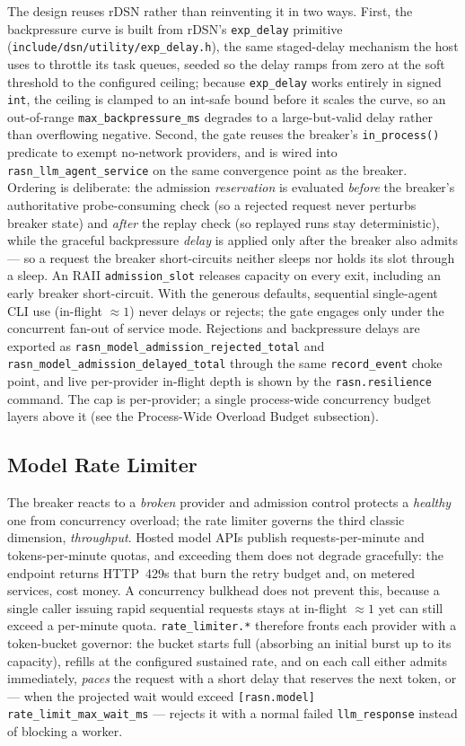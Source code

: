 \documentclass[manuscript,screen,review]{acmart}
\newcommand{\rdsn}{rDSN\xspace}
\begin{document}
The design reuses \rdsn rather than reinventing it in two ways. First, the
backpressure curve is built from \rdsn's \texttt{exp\_delay} primitive
(\texttt{include/dsn/utility/exp\_delay.h}), the same staged-delay mechanism the host
uses to throttle its task queues, seeded so the delay ramps from zero at the soft
threshold to the configured ceiling; because \texttt{exp\_delay} works entirely in
signed \texttt{int}, the ceiling is clamped to an int-safe bound before it scales the
curve, so an out-of-range \texttt{max\_backpressure\_ms} degrades to a
large-but-valid delay rather than overflowing negative. Second, the gate reuses the
breaker's \texttt{in\_process()} predicate to exempt no-network providers, and is
wired into \texttt{rasn\_llm\_agent\_service} on the same convergence point as the
breaker. Ordering is deliberate: the admission \emph{reservation} is evaluated
\emph{before} the breaker's authoritative probe-consuming check (so a rejected
request never perturbs breaker state) and \emph{after}
the replay check (so replayed runs stay deterministic), while the graceful
backpressure \emph{delay} is applied only after the breaker also admits --- so a
request the breaker short-circuits neither sleeps nor holds its slot through a
sleep. An RAII \texttt{admission\_slot} releases capacity on every exit, including
an early breaker short-circuit. With the generous
defaults, sequential single-agent CLI use (in-flight $\approx 1$) never delays or
rejects; the gate engages only under the concurrent fan-out of service mode.
Rejections and backpressure delays are exported as
\texttt{rasn\_model\_admission\_rejected\_total} and
\texttt{rasn\_model\_admission\_delayed\_total} through the same
\texttt{record\_event} choke point, and live per-provider in-flight depth is shown by
the \texttt{rasn.resilience} command. The cap is per-provider; a single
process-wide concurrency budget layers above it (see the Process-Wide Overload
Budget subsection).

\subsection{Model Rate Limiter}

The breaker reacts to a \emph{broken} provider and admission control protects a
\emph{healthy} one from concurrency overload; the rate limiter governs the third
classic dimension, \emph{throughput}. Hosted model APIs publish
requests-per-minute and tokens-per-minute quotas, and exceeding them does not
degrade gracefully: the endpoint returns HTTP~429s that burn the retry budget
and, on metered services, cost money. A concurrency bulkhead does not prevent
this, because a single caller issuing rapid sequential requests stays at
in-flight $\approx 1$ yet can still exceed a per-minute quota.
\texttt{rate\_limiter.*} therefore fronts each provider with a token-bucket
governor: the bucket starts full (absorbing an initial burst up to its capacity),
refills at the configured sustained rate, and on each call either admits
immediately, \emph{paces} the request with a short delay that reserves the next
token, or --- when the projected wait would exceed
\texttt{[rasn.model] rate\_limit\_max\_wait\_ms} --- rejects it with a normal failed
\texttt{llm\_response} instead of blocking a worker.
\end{document}
